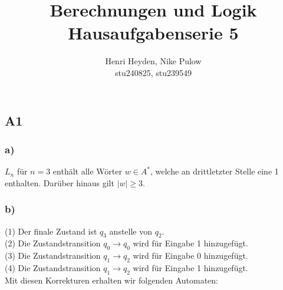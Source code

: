 \documentclass[12pt, a4paper]{article}
\title{Berechnungen und Logik\\Hausaufgabenserie 5}
\author{Henri Heyden, Nike Pulow \\ \small stu240825, stu239549}
\date{}
\begin{document}
\maketitle

\doublespacing
\subsection*{A1}
\subsubsection*{a)}
\(L_n\) für \(n = 3\) enthält alle Wörter \(w \in A^*\), welche an drittletzter Stelle eine 1 enthalten. Darüber hinaus gilt \(\vert w \vert \geq 3\).
\subsubsection*{b)}
(1) Der finale Zustand ist \(q_3\) anstelle von \(q_2\).\\
(2) Die Zustandstransition \(q_0 \rightarrow q_0\) wird für Eingabe 1 hinzugefügt.\\
(3) Die Zustandstransition \(q_1 \rightarrow q_2\) wird für Eingabe 0 hinzugefügt.\\
(4) Die Zustandstransition \(q_1 \rightarrow q_2\) wird für Eingabe 1 hinzugefügt.\\
Mit diesen Korrekturen erhalten wir folgenden Automaten:\\
\begin{center}
\end{center}
\end{document}
